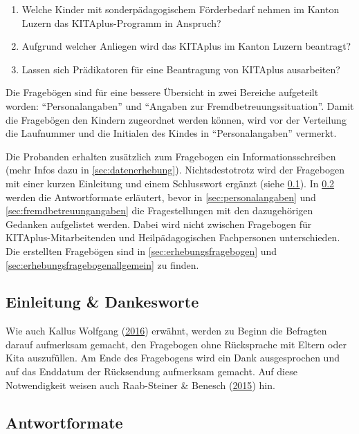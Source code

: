 \documentclass[
  ngerman,
  11pt,
  paper=a4,
  twoside,
  titlepage=true,
  openright,
  abstract=on,
  toc=listofnumbered,
  numbers=noenddot,
  chapterprefix=true,
  headings=optiontohead,
  svgnames,
  dvipsnames]{scrreprt}
\begin{document}
\begin{enumerate}
\def\labelenumi{\arabic{enumi}.}
\item
  Welche Kinder mit sonderpädagogischem Förderbedarf nehmen im Kanton
  Luzern das KITAplus-Programm in Anspruch?
\item
  Aufgrund welcher Anliegen wird das KITAplus im Kanton Luzern
  beantragt?
\item
  Lassen sich Prädikatoren für eine Beantragung von KITAplus
  ausarbeiten?
\end{enumerate}

Die Fragebögen sind für eine bessere Übersicht in zwei Bereiche
aufgeteilt worden: “Personalangaben” und “Angaben zur
Fremdbetreuungssituation”. Damit die Fragebögen den Kindern zugeordnet
werden können, wird vor der Verteilung die Laufnummer und die Initialen
des Kindes in “Personalangaben” vermerkt.

Die Probanden erhalten zusätzlich zum Fragebogen ein
Informationsschreiben (mehr Infos dazu in \cref{sec:datenerhebung}).
Nichtsdestotrotz wird der Fragebogen mit einer kurzen Einleitung und
einem Schlusswort ergänzt (siehe \cref{sec:einleitungfragebogen}). In
\cref{sec:skalierung} werden die Antwortformate erläutert, bevor in
\cref{sec:personalangaben} und \cref{sec:fremdbetreuungangaben} die
Fragestellungen mit den dazugehörigen Gedanken aufgelistet werden. Dabei
wird nicht zwischen Fragebogen für KITAplus-Mitarbeitenden und
Heilpädagogischen Fachpersonen unterschieden. Die erstellten Fragebögen
sind in \cref{sec:erhebungsfragebogen} und
\cref{sec:erhebungsfragebogenallgemein} zu finden.

\hypertarget{sec:einleitungfragebogen}{%
\subsection{Einleitung \& Dankesworte}\label{sec:einleitungfragebogen}}

Wie auch Kallus Wolfgang (\protect\hyperlink{ref-kallus2016}{2016})
erwähnt, werden zu Beginn die Befragten darauf aufmerksam gemacht, den
Fragebogen ohne Rücksprache mit Eltern oder Kita auszufüllen. Am Ende
des Fragebogens wird ein Dank ausgesprochen und auf das Enddatum der
Rücksendung aufmerksam gemacht. Auf diese Notwendigkeit weisen auch
Raab-Steiner \& Benesch (\protect\hyperlink{ref-raabsteiner}{2015}) hin.

\hypertarget{sec:skalierung}{%
\subsection{Antwortformate}\label{sec:skalierung}}
\end{document}
